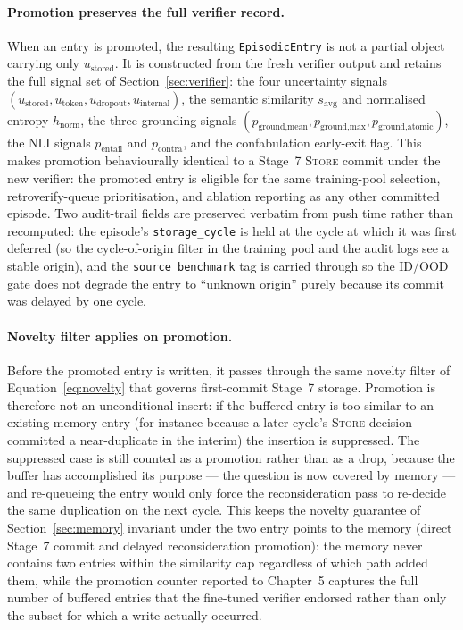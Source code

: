 \paragraph{Promotion preserves the full verifier record.}
When an entry is promoted, the resulting \texttt{EpisodicEntry} is not a partial object carrying only $u_{\text{stored}}$. It is constructed from the fresh verifier output and retains the full signal set of Section~\ref{sec:verifier}: the four uncertainty signals $(u_{\text{stored}}, u_{\text{token}}, u_{\text{dropout}}, u_{\text{internal}})$, the semantic similarity $s_{\text{avg}}$ and normalised entropy $h_{\text{norm}}$, the three grounding signals $(p_{\text{ground,mean}}, p_{\text{ground,max}}, p_{\text{ground,atomic}})$, the NLI signals $p_{\text{entail}}$ and $p_{\text{contra}}$, and the confabulation early-exit flag. This makes promotion behaviourally identical to a Stage~7 \textsc{Store} commit under the new verifier: the promoted entry is eligible for the same training-pool selection, retroverify-queue prioritisation, and ablation reporting as any other committed episode. Two audit-trail fields are preserved verbatim from push time rather than recomputed: the episode's \texttt{storage\_cycle} is held at the cycle at which it was first deferred (so the cycle-of-origin filter in the training pool and the audit logs see a stable origin), and the \texttt{source\_benchmark} tag is carried through so the ID/OOD gate does not degrade the entry to ``unknown origin'' purely because its commit was delayed by one cycle.

\paragraph{Novelty filter applies on promotion.}
Before the promoted entry is written, it passes through the same novelty filter of Equation~\ref{eq:novelty} that governs first-commit Stage~7 storage. Promotion is therefore not an unconditional insert: if the buffered entry is too similar to an existing memory entry (for instance because a later cycle's \textsc{Store} decision committed a near-duplicate in the interim) the insertion is suppressed. The suppressed case is still counted as a promotion rather than as a drop, because the buffer has accomplished its purpose --- the question is now covered by memory --- and re-queueing the entry would only force the reconsideration pass to re-decide the same duplication on the next cycle. This keeps the novelty guarantee of Section~\ref{sec:memory} invariant under the two entry points to the memory (direct Stage~7 commit and delayed reconsideration promotion): the memory never contains two entries within the similarity cap regardless of which path added them, while the promotion counter reported to Chapter~5 captures the full number of buffered entries that the fine-tuned verifier endorsed rather than only the subset for which a write actually occurred.

